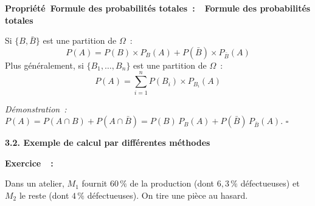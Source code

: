 \documentclass[11pt,a4paper]{article}
\newcounter{numexos}
\newcommand{\bex}[2]{%
\def\bextitle{#1}%
\addtocounter{numexos}{1}%
\begin{tcolorbox}[colback=white,colframe=black!30,arc=3pt,boxrule=0.6pt,
  left=4mm,right=4mm,top=1mm,bottom=2mm]%
  \textbf{Exercice~\thenumexos\ifx\bextitle\empty\else~:~~#1\fi}\par
  #2%
\end{tcolorbox}}
\newcounter{nump}
\newcommand{\bprop}[2]{%
\addtocounter{nump}{1}%
\begin{tcolorbox}[colback=white,colframe=teal!60,arc=3pt,boxrule=0.8pt,
  left=4mm,right=4mm,top=1mm,bottom=2mm]%
  \textbf{Propriété~\thenump\ifx\relax#1\relax\else~:~~#1\fi}\par
  \smallskip #2%
\end{tcolorbox}}
\begin{document}
\vfill

\bprop{Formule des probabilités totales}{%
Si $\{B,\bar{B}\}$ est une partition de $\Omega$~:
$$\boxed{P(A)=P(B)\times P_B(A)+P(\bar{B})\times P_{\bar{B}}(A)}$$
Plus généralement, si $\{B_1,\ldots,B_n\}$ est une partition de $\Omega$~:
$$P(A)=\sum_{i=1}^{n}P(B_i)\times P_{B_i}(A)$$}

\textit{Démonstration~:} $P(A)=P(A\cap B)+P(A\cap\bar{B})=P(B)\,P_B(A)+P(\bar{B})\,P_{\bar{B}}(A)$. \hfill$\square$

\newpage

\begin{mybox}
\begin{center}\textbf{3.2. Exemple de calcul par différentes méthodes}\end{center}
\end{mybox}

\bex{}{%
Dans un atelier, $M_1$ fournit $60\,\%$ de la production (dont $6{,}3\,\%$ défectueuses) et $M_2$ le reste (dont $4\,\%$ défectueuses). On tire une pièce au hasard.}
\end{document}
